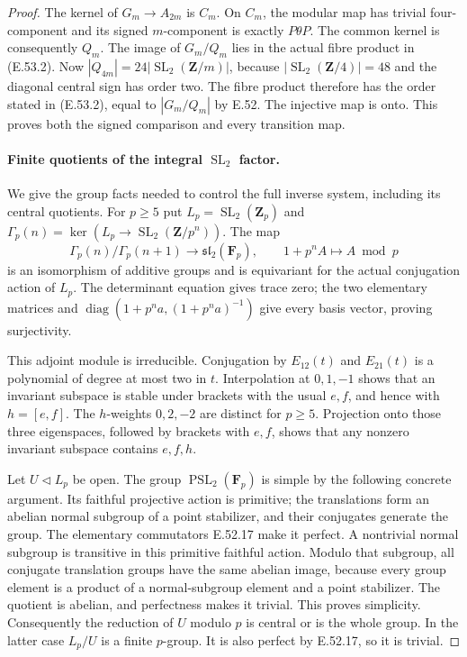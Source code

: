 \begin{proof}
The kernel of $G_m\to A_{2m}$ is $C_m$.
On $C_m$, the modular map has trivial four-component
and its signed $m$-component is exactly $P\theta P$.
The common kernel is consequently $Q_m$.
The image of $G_m/Q_m$ lies in the actual fibre
product in \textup{(E.53.2)}.
Now $|Q_{4m}|=24|\operatorname{SL}_2(\mathbf Z/m)|$,
because $|\operatorname{SL}_2(\mathbf Z/4)|=48$ and
the diagonal central sign has order two.
The fibre product therefore has the order stated in
\textup{(E.53.2)}, equal to $|G_m/Q_m|$ by E.52.
The injective map is onto. This proves both the
signed comparison and every transition map.

\paragraph{Finite quotients of the integral $\operatorname{SL}_2$ factor.}
We give the group facts needed to control the full
inverse system, including its central quotients.
For $p\geq5$ put
$L_p=\operatorname{SL}_2(\mathbf Z_p)$ and
$\Gamma_p(n)=\ker(L_p\to\operatorname{SL}_2(\mathbf Z/p^n))$.
The map
\[
 \Gamma_p(n)/\Gamma_p(n+1)\longrightarrow\mathfrak{sl}_2(\mathbf F_p),
              \qquad 1+p^n A\longmapsto A\bmod p
 \tag{E.53.8}
\]
is an isomorphism of additive groups and is equivariant
for the actual conjugation action of $L_p$.
The determinant equation gives trace zero; the two
elementary matrices and $\operatorname{diag}(1+p^na,(1+p^na)^{-1})$
give every basis vector, proving surjectivity.

This adjoint module is irreducible.
Conjugation by $E_{12}(t)$ and $E_{21}(t)$ is a
polynomial of degree at most two in $t$.
Interpolation at $0,1,-1$ shows that an invariant
subspace is stable under brackets with the usual
$e,f$, and hence with $h=[e,f]$.
The $h$-weights $0,2,-2$ are distinct for $p\geq5$.
Projection onto those three eigenspaces, followed
by brackets with $e,f$, shows that any nonzero
invariant subspace contains $e,f,h$.

Let $U\triangleleft L_p$ be open.
The group $\operatorname{PSL}_2(\mathbf F_p)$ is simple
by the following concrete argument. Its faithful
projective action is primitive; the translations form
an abelian normal subgroup of a point stabilizer,
and their conjugates generate the group. The elementary
commutators E.52.17 make it perfect.
A nontrivial normal subgroup is transitive in this
primitive faithful action. Modulo that subgroup,
all conjugate translation groups have the same
abelian image, because every group element is a
product of a normal-subgroup element and a point
stabilizer. The quotient is abelian, and perfectness
makes it trivial. This proves simplicity.
Consequently the reduction of $U$ modulo $p$ is
central or is the whole group. In the latter case
$L_p/U$ is a finite $p$-group. It is also perfect
by E.52.17, so it is trivial.


\end{proof}
